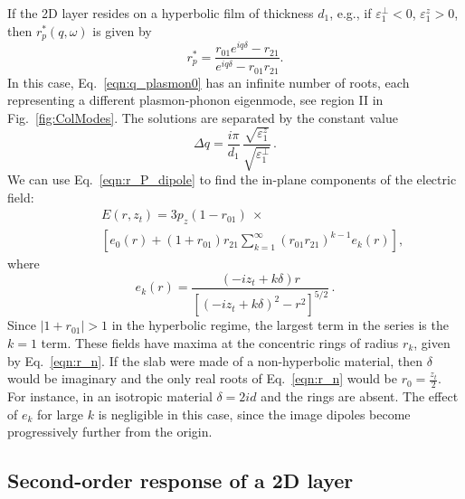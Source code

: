 \documentclass[aps, prb, reprint, superscriptaddress]{revtex4-2}
\begin{document}
If the 2D layer resides on a hyperbolic film of thickness $d_1$, e.g., if $\varepsilon_1^\perp < 0$, $\varepsilon_1^z > 0$,
then $r_p^*(q, \omega)$  is given by 
\begin{equation}
	r_p^* = \frac{r_{01}e^{i q \delta} - r_{21} %
	}{e^{i q \delta} - r_{01} r_{21}}.
	\label{eqn:r_P_dipole}
\end{equation}
In this case, Eq.~\eqref{eqn:q_plasmon0} has an infinite number of roots, each representing a different plasmon-phonon eigenmode, see region II in Fig.~\ref{fig:ColModes}. 
The solutions are separated by the constant value
\begin{equation}
\Delta q = \frac{i \pi}{d_1}\, \frac{\sqrt{\varepsilon_1^z}}{\sqrt{\varepsilon_1^\perp}}\,. 
\label{eqn:Delta_q}
\end{equation}
We can use Eq.~\eqref{eqn:r_P_dipole} to find the in-plane components of the electric field: 
\begin{equation}
	\begin{split}
		\qquad &E(r, z_t) =  3 p_z (1 - r_{01}) \ \times \\ &\left[
		e_0(r) + (1 + r_{01}) r_{21} \sum_{k = 1}^{\infty} (r_{01} r_{21})^{k - 1} e_k(r)
		\right],
		\label{eqn:E_r_images}
	\end{split}
\end{equation}
where
\begin{equation}
	e_{k}(r) = \frac{(-i z_t + k \delta) r}{\left[\left(-i z_t + k \delta\right)^2 - r^2\right]^{5/2}} \,.
	\label{eqn:e_n}
\end{equation}
Since $|1 + r_{01}|>1$ in the hyperbolic regime, the largest term in the series is the $k=1$ term. 
These fields have maxima at the concentric rings of radius $r_k$, given by Eq.~\eqref{eqn:r_n}. 
If the slab were made of a non-hyperbolic material, then $\delta$ would be imaginary and the only real roots of Eq.~\eqref{eqn:r_n} would be $r_0 = \frac{z_t}{2}$.
For instance, in an isotropic material $\delta = 2 i d$ and the rings are absent. 
The effect of $e_k$ for large $k$ is negligible in this case, since the image dipoles become progressively further from the origin. 


\subsection{Second-order response of a 2D layer}
\label{ssec:NSO}
\end{document}

